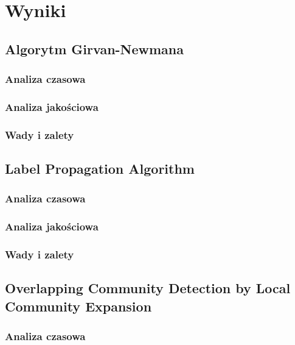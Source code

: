 \documentclass{article}
\begin{document}
\section{Wyniki}

\subsection{Algorytm Girvan-Newmana}
\subsubsection{Analiza czasowa}
\subsubsection{Analiza jakościowa}
\subsubsection{Wady i zalety}

\subsection{Label Propagation Algorithm}
\subsubsection{Analiza czasowa}
\subsubsection{Analiza jakościowa}
\subsubsection{Wady i zalety}

\subsection{Overlapping Community Detection by Local Community Expansion}
\subsubsection{Analiza czasowa}
\end{document}
